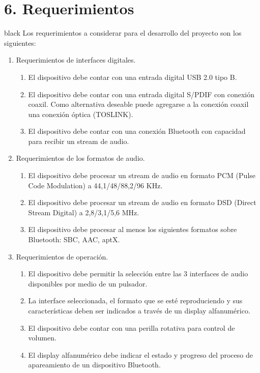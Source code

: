 \documentclass[
11pt, %
]{charter}
\begin{document}
\section{6. Requerimientos}
\label{sec:requerimientos}

\begin{consigna}{black}
Los requerimientos a considerar para el desarrollo del proyecto son los siguientes:

\begin{enumerate}
	\item Requerimientos de interfaces digitales.
		\begin{enumerate}
			\item El dispositivo debe contar con una entrada digital USB 2.0 tipo B. 
			\item El dispositivo debe contar con una entrada digital S/PDIF con conexión coaxil. Como alternativa deseable puede agregarse a la conexión coaxil una conexión óptica (TOSLINK).
			\item El dispositivo debe contar con una conexión Bluetooth con capacidad para recibir un stream de audio.   
		\end{enumerate}
	\item Requerimientos de los formatos de audio.
		\begin{enumerate}
			\item El dispositivo debe procesar un stream de audio en formato PCM (Pulse Code Modulation) a 44,1/48/88,2/96 KHz.
			\item El dispositivo debe procesar un stream de audio en formato DSD (Direct Stream Digital) a 2,8/3,1/5,6 MHz.
			\item El dispositivo debe procesar al menos los siguientes formatos sobre Bluetooth: SBC, AAC, aptX.  
		\end{enumerate}
	\item Requerimientos de operación.
		\begin{enumerate}		
			\item El dispositivo debe permitir la selección entre las 3 interfaces de audio disponibles por medio de un pulsador. 	
			\item La interface seleccionada, el formato que se esté reproduciendo y sus características deben ser indicados a través de un display alfanumérico.
			\item El dispositivo debe contar con una perilla rotativa para control de volumen. 
			\item El display alfanumérico debe indicar el estado y progreso del proceso de apareamiento de un dispositivo Bluetooth.

\end{enumerate}
\end{enumerate}
\end{consigna}
\end{document}
